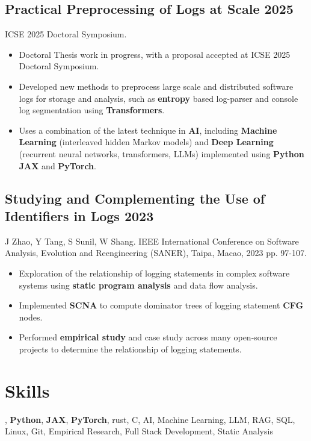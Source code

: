 \documentclass[10pt,letterpaper]{article}
\newcommand{\datedsubsection}[2]{\subsection[#1]{#1 \hfill #2}}
\renewcommand{\emph}[1]{{\color{emphcolor}\bfseries#1}}
\begin{document}
\datedsubsection{Practical Preprocessing of Logs at Scale}{2025}
\noindent ICSE 2025 Doctoral Symposium.
\begin{itemize}
    \item Doctoral Thesis work in progress, with a proposal accepted at ICSE 2025 Doctoral Symposium.
    \item Developed new methods to preprocess large scale and distributed
    software logs for storage and analysis, such as \emph{entropy} based
    log-parser and console log segmentation using \emph{Transformers}.
    \item Uses a combination of the latest technique in \emph{AI}, including
    \emph{Machine Learning} (interleaved hidden Markov models) and \emph{Deep
    Learning} (recurrent neural networks, transformers, LLMs) implemented using
    \emph{Python} \emph{JAX} and \emph{PyTorch}.
\end{itemize}

\datedsubsection{Studying and Complementing the Use of Identifiers in Logs}{2023}
\noindent J Zhao, Y Tang, S Sunil, W Shang. IEEE International Conference on Software Analysis, Evolution and Reengineering (SANER), Taipa, Macao,
2023 pp. 97-107.
\begin{itemize}
    \item Exploration of the relationship of logging statements in complex
    software systems using \emph{static program analysis} and data flow analysis.
    \item Implemented \emph{SCNA} to compute dominator trees of logging statement \emph{CFG} nodes.
    \item Performed \emph{empirical study} and case study across many open-source
    projects to determine the relationship of logging statements.
\end{itemize}

\section{Skills}
\vspace{1pt}
\noindent \emph{C++20}, \emph{Python}, \emph{JAX}, \emph{PyTorch}, rust, C, AI, Machine Learning, LLM, RAG, SQL, Linux, Git, Empirical Research, Full Stack Development, Static Analysis
\end{document}
